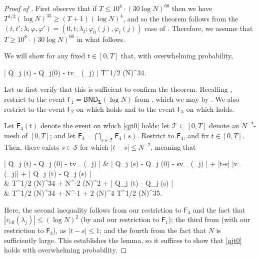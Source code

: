 \documentclass{amsart}
\numberwithin{equation}{section}
\DeclareMathOperator{\eff}{eff}
\theoremstyle{remark}
\theoremstyle{definition}
\begin{document}
	\label{ProofV} 
	
	\begin{proof}[Proof of ]
		
		First observe that if $T \le 10^8 \cdot (30 \log N)^{60}$ then we have $T^{1/2} (\log N)^{35} \ge (T+1) (\log N)^4$, and so the theorem follows from the $(t, t'; \lambda; \varphi, \varphi') = (0, t; \lambda_j; \varphi_0 (j), \varphi_t (j))$ case of . Therefore, we assume that $T \ge 10^8 \cdot (30 \log N)^{60}$ in what follows. 
		
		We will show for any fixed $t \in [0,T]$ that, with overwhelming probability, 
		\begin{flalign}
			\label{qjt0} 
		 \big| Q_j (t) - Q_j(0) - tv_{\eff} (\lambda_j) \big| \le T^{1/2} (\log N)^{34}.
		\end{flalign} 
		
		\noindent Let us first verify that this is sufficient to confirm the theorem. Recalling , restrict to the event $\mathsf{F}_1 = \mathsf{BND}_{\bm{L}} (\log N)$ from , which we may by . We also restrict to the event $\mathsf{F}_2$ on which  holds and to the event $\mathsf{F}_3$ on which  holds.
		
		Let $\mathsf{F}_4 (t)$ denote the event on which \eqref{qjt0} holds; let $\mathcal{T} \subseteq [0, T]$ denote an $N^{-2}$-mesh of $[0, T]$; and let $\mathsf{F}_4 = \bigcap_{s \in \mathcal{T}} \mathsf{F}_4 (s)$. Restrict to $\mathsf{F}_4$, and fix $t \in [0, T]$. Then, there exists $s \in \mathcal{S}$ for which $|t-s| \le N^{-2}$, meaning that 
		\begin{flalign*}
			\big| Q_j (t) - Q_j (0) - tv_{\eff} (\lambda_j) \big| & \le \big| Q_j (s) - Q_j (0) - sv_{\eff} (\lambda_j) \big| + |t-s| \cdot |v_{\eff} (\lambda_j)| + | Q_j (t) - Q_j (s) | \\
			& \le  T^{1/2} (\log N)^{34} + N^{-2} \cdot (\log N)^2 + | Q_j (t) - Q_j (s) | \\
			& \le T^{1/2} (\log N)^{34} + N^{-1} + 2 (\log N)^4 \le T^{1/2} (\log N)^{35}.
		\end{flalign*} 
		
		\noindent Here, the second inequality follows from our restriction to $\mathsf{F}_4$ and the fact that $|v_{\eff} (\lambda_j)| \le (\log N)^2$ (by  and our restriction to $\mathsf{F}_1$); the third from  (with our restriction to $\mathsf{F}_3$), as $|t-s| \le 1$; and the fourth from the fact that $N$ is sufficiently large. This establishes the lemma, so it suffices to show that \eqref{qjt0} holds with overwhelming probability. 
		

\end{proof}
\end{document}
